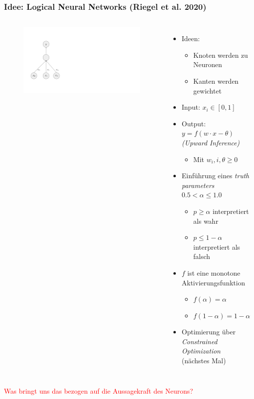 \documentclass[aspectratio=169]{beamer}
\begin{document}
\begin{frame}\frametitle{Idee: Logical Neural Networks (Riegel et al. 2020)}
\begin{columns}
        \begin{figure}
            \centering
            \includegraphics[trim={0 4cm 21cm 4cm },clip,width=\linewidth]{8_LNN.png}
        \end{figure}
    \begin{itemize}
        \item Ideen:
        \begin{itemize}
            \item Knoten werden zu Neuronen
            \item Kanten werden gewichtet
        \end{itemize}
        \item Input: $x_i \in [0,1]$
        \item Output: $y=f(w \cdot x - \theta)$ \textit{(Upward Inference)} 
        \begin{itemize}
            \item Mit $w_i,i, \theta \geq 0$
        \end{itemize}
      
        \item Einführung eines \textit{truth parameters} $0.5 < \alpha \leq 1.0$
        \begin{itemize}
            \item $p\geq \alpha $ interpretiert als wahr
            \item $p \leq 1 - \alpha$ interpretiert als falsch
        \end{itemize}
        \item $f$ ist eine monotone Aktivierungsfunktion
        \begin{itemize}
            \item $f(\alpha) = \alpha$
            \item $f(1- \alpha) = 1- \alpha$
        \end{itemize}
        \item Optimierung über \textit{Constrained Optimization} (nächstes Mal)
    \end{itemize} 
\end{columns}
\pause
\vspace{1mm}
\textcolor{red}{Was bringt uns das bezogen auf die Aussagekraft des Neurons?}
\end{frame}
\end{document}
